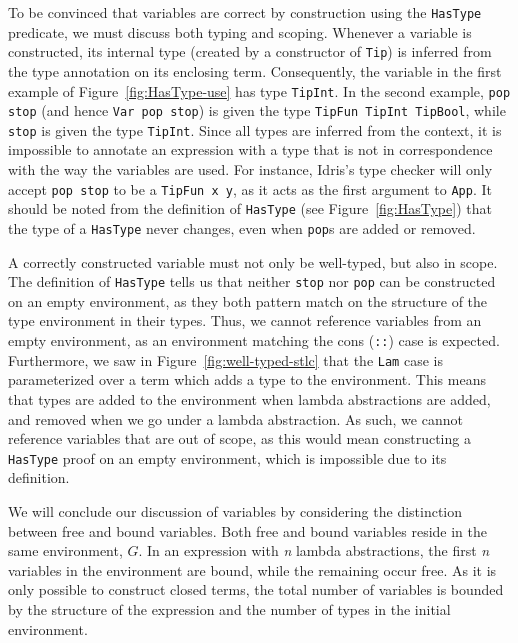 To be convinced that variables are correct by construction using the \texttt{HasType} predicate, we must discuss both typing and scoping. Whenever a variable is constructed, its internal type (created by a constructor of \texttt{Tip}) is inferred from the type annotation on its enclosing term. Consequently, the variable in the first example of Figure~\ref{fig:HasType-use} has type \texttt{TipInt}. In the second example, \texttt{pop stop} (and hence \texttt{Var pop stop}) is given the type \texttt{TipFun TipInt TipBool}, while \texttt{stop} is given the type \texttt{TipInt}. Since all types are inferred from the context, it is impossible to annotate an expression with a type that is not in correspondence with the way the variables are used. For instance, Idris's type checker will only accept \texttt{pop stop} to be a \texttt{TipFun x y}, as it acts as the first argument to \texttt{App}. It should be noted from the definition of \texttt{HasType} (see Figure~\ref{fig:HasType}) that the type of a \texttt{HasType} never changes, even when \texttt{pop}s are added or removed. 

A correctly constructed variable must not only be well-typed, but also in scope. The definition of \texttt{HasType} tells us that neither \texttt{stop} nor \texttt{pop} can be constructed on an empty environment, as they both pattern match on the structure of the type environment in their types. Thus, we cannot reference variables from an empty environment, as an environment matching the cons (\texttt{::}) case is expected. Furthermore, we saw in Figure~\ref{fig:well-typed-stlc} that the \texttt{Lam} case is parameterized over a term which adds a type to the environment. This means that types are added to the environment when lambda abstractions are added, and removed when we go under a lambda abstraction. As such, we cannot reference variables that are out of scope, as this would mean constructing a \texttt{HasType} proof on an empty environment, which is impossible due to its definition. 

We will conclude our discussion of variables by considering the distinction between free and bound variables. Both free and bound variables reside in the same environment, $G$. In an expression with \textit{n} lambda abstractions, the first \textit{n} variables in the environment are bound, while the remaining occur free. As it is only possible to construct closed terms, the total number of variables is bounded by the structure of the expression and the number of types in the initial environment.

